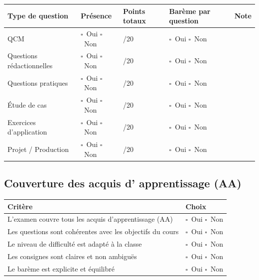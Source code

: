 \documentclass[12pt,a4paper]{article}
\newcommand{\checkbox}{\(\square\)}
\newcommand{\yesno}{\checkbox\ Oui \hspace{1cm} \checkbox\ Non}
\newcommand{\cbox}{\(\square\)}
\begin{document}
\begin{longtable}{|p{5cm}|p{2.5cm}|p{2.5cm}|p{3cm}|p{2cm}|}
\hline
\rowcolor{EcoleGris}
\textbf{Type de question} & \textbf{Présence} & \textbf{Points totaux} & \textbf{Barème par question} & \textbf{Note} \\ \hline

QCM 
& \cbox\ Oui \hspace{0.3cm} \cbox\ Non 
& /20 
& \cbox\ Oui \hspace{0.3cm} \cbox\ Non 
& \\ \hline

Questions rédactionnelles 
& \cbox\ Oui \hspace{0.3cm} \cbox\ Non 
& /20 
& \cbox\ Oui \hspace{0.3cm} \cbox\ Non 
& \\ \hline

Questions pratiques 
& \cbox\ Oui \hspace{0.3cm} \cbox\ Non 
& /20 
& \cbox\ Oui \hspace{0.3cm} \cbox\ Non 
& \\ \hline

Étude de cas 
& \cbox\ Oui \hspace{0.3cm} \cbox\ Non 
& /20 
& \cbox\ Oui \hspace{0.3cm} \cbox\ Non 
& \\ \hline

Exercices d’application 
& \cbox\ Oui \hspace{0.3cm} \cbox\ Non 
& /20 
& \cbox\ Oui \hspace{0.3cm} \cbox\ Non 
& \\ \hline

Projet / Production 
& \cbox\ Oui \hspace{0.3cm} \cbox\ Non 
& /20 
& \cbox\ Oui \hspace{0.3cm} \cbox\ Non 
& \\ \hline


\end{longtable}

\subsection*{Couverture des acquis d' apprentissage (AA)}
\begin{longtable}{|p{10cm}|p{5cm}|}
\hline
\rowcolor{EcoleGris}
\textbf{Critère} & \textbf{Choix} \\ \hline
L'examen couvre tous les acquis d'apprentissage (AA) & \yesno \\ \hline
Les questions sont cohérentes avec les objectifs du cours & \yesno \\ \hline
Le niveau de difficulté est adapté à la classe & \yesno \\ \hline
Les consignes sont claires et non ambiguës & \yesno \\ \hline
Le barème est explicite et équilibré & \yesno \\ \hline
\end{longtable}
\end{document}

